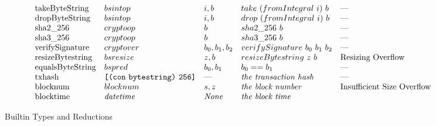 \documentclass[../main.tex]{subfiles}
\begin{document}
\begin{figure*}[t]
\[\begin{array}{lllll}
        \mathrm{takeByteString}    &   bsintop   &   i, b     & take ~ (fromIntegral ~ i) ~ b   &   \textrm{---} \\
        \mathrm{dropByteString}    &   bsintop   &   i, b     & drop ~ (fromIntegral ~ i) ~ b   &   \textrm{---} \\
        
        \mathrm{sha2\_256}         &  cryptoop  &   b           & sha2\_256 ~ b    & \textrm{---}                \\
        \mathrm{sha3\_256}         &  cryptoop  &   b           & sha3\_256~ b     & \textrm{---}                \\
        
        \mathrm{verifySignature}   &  cryptover  &   b_0, b_1, b_2           & verifySignature ~ b_0 ~ b_1 ~ b_2   &   \textrm{---}          \\
        
        \mathrm{resizeBytestring}   &   bsresize   &   z, b   &   resizeBytestring ~ z ~ b   &   \textrm{Resizing Overflow} \\
        
        \mathrm{equalsByteString}  &   bspred   &   b_0 , b_1   & b_0 == b_1   &   \textrm{---}  \\
        
        \mathrm{txhash}   &   \texttt{[} \texttt{(} \texttt{con} ~ \texttt{bytestring} \texttt{)} ~ \texttt{256} \texttt{]}   &   \textrm{---}  & \textit{the transaction hash}   &   \textrm{---}  \\
        
        \mathrm{blocknum}  &  blocknum  & s, z & \textit{the block number}   &   \textrm{Insufficient Size Overflow}  \\
        
        \mathrm{blocktime} &  \mathit{datetime}  &  \textit{None}  & \textit{the block time}   &   \textrm{}  \\
    \end{array}\]
    
    \caption{Builtin Types and Reductions}
    \label{fig:Plutus_core_builtins}
\end{figure*}

\normalsize
\end{document}
